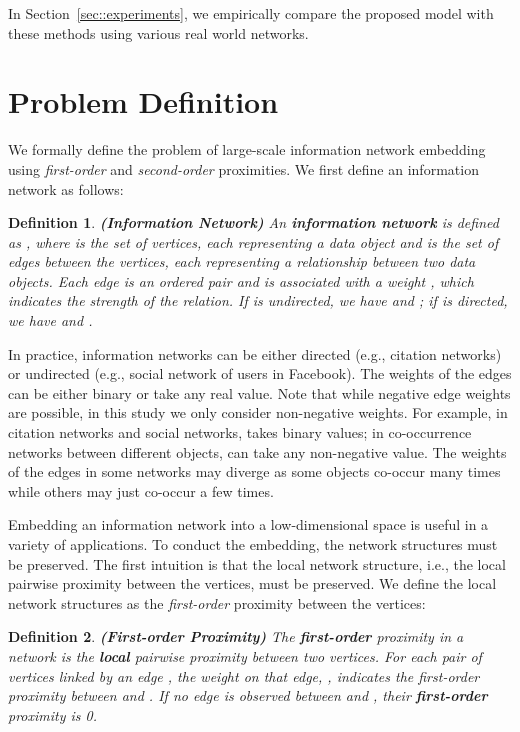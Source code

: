 \documentclass{sig-alternate-2013}
\newtheorem{definition}{Definition}
\begin{document}
In Section~\ref{sec::experiments}, we empirically compare the proposed model with these methods using various real world networks. 




\section{Problem Definition}
\label{sec::definition}



We formally define the problem of large-scale information network embedding using \emph{first-order} and \emph{second-order} proximities.  We first define an information network as follows:

\begin{definition}
	\label{def::information_network}
	\textbf{(Information Network)}
	\textsl{An \textbf{information network} is defined as , where  is the set of vertices, each representing a data object and  is the set of edges between the vertices, each representing a relationship between two data objects. Each edge  is an ordered pair  and is associated with a weight , which indicates the strength of the relation. If  is undirected, we have  and ; if  is directed, we have  and . }
\end{definition}

In practice, information networks can be either directed (e.g., citation networks) or undirected (e.g., social network of users in Facebook). The weights of the edges can be either binary or take any real value. Note that while negative edge weights are possible, in this study we only consider non-negative weights. For example, in citation networks and social networks,  takes binary values; in co-occurrence networks between different objects,  can take any non-negative value. The weights of the edges in some networks may diverge as some objects co-occur many times while others may just co-occur a few times. 

Embedding an information network into a low-dimensional space is useful in a variety of applications. To conduct the embedding, the network structures must be preserved. The first intuition is that the local network structure, i.e., the local pairwise proximity between the vertices, must be preserved. We define the local network structures as the \emph{first-order} proximity between the vertices: 



\begin{definition}
	\label{def::1st-proximity}
	\textbf{(First-order Proximity)} 
	\textsl{The \textbf{first-order} proximity in a network is the \textbf{local} pairwise proximity between two vertices. For each pair of vertices linked by an edge , the weight on that edge, , indicates the first-order proximity between  and . If no edge is observed between  and , their \textbf{first-order} proximity is 0.}
\end{definition}
\end{document}
